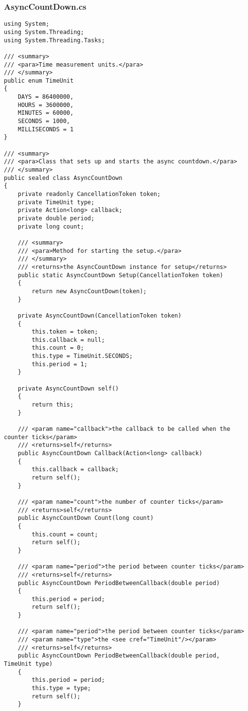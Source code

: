 \subsubsection*{AsyncCountDown.cs}
\begin{verbatim}
using System;
using System.Threading;
using System.Threading.Tasks;

/// <summary>
/// <para>Time measurement units.</para>
/// </summary>
public enum TimeUnit
{
    DAYS = 86400000,
    HOURS = 3600000,
    MINUTES = 60000,
    SECONDS = 1000,
    MILLISECONDS = 1
}

/// <summary>
/// <para>Class that sets up and starts the async countdown.</para>
/// </summary>
public sealed class AsyncCountDown
{
    private readonly CancellationToken token;
    private TimeUnit type;
    private Action<long> callback;
    private double period;
    private long count;

    /// <summary>
    /// <para>Method for starting the setup.</para>
    /// </summary>
    /// <returns>the AsyncCountDown instance for setup</returns>
    public static AsyncCountDown Setup(CancellationToken token)
    {
        return new AsyncCountDown(token);
    }

    private AsyncCountDown(CancellationToken token)
    {
        this.token = token;
        this.callback = null;
        this.count = 0;
        this.type = TimeUnit.SECONDS;
        this.period = 1;
    }

    private AsyncCountDown self()
    {
        return this;
    }

    /// <param name="callback">the callback to be called when the counter ticks</param>
    /// <returns>self</returns>
    public AsyncCountDown Callback(Action<long> callback)
    {
        this.callback = callback;
        return self();
    }

    /// <param name="count">the number of counter ticks</param>
    /// <returns>self</returns>
    public AsyncCountDown Count(long count)
    {
        this.count = count;
        return self();
    }

    /// <param name="period">the period between counter ticks</param>
    /// <returns>self</returns>
    public AsyncCountDown PeriodBetweenCallback(double period)
    {
        this.period = period;
        return self();
    }

    /// <param name="period">the period between counter ticks</param>
    /// <param name="type">the <see cref="TimeUnit"/></param>
    /// <returns>self</returns>
    public AsyncCountDown PeriodBetweenCallback(double period, TimeUnit type)
    {
        this.period = period;
        this.type = type;
        return self();
    }


\end{verbatim}
